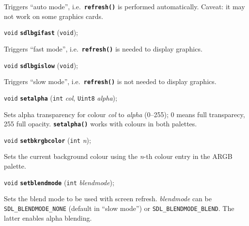 \documentclass[a4paper,12pt]{article}
\newcommand{\V}{\texttt{void}}      %
\newcommand{\I}{\texttt{int}}       %
\newcommand{\Ue}{\texttt{Uint8}}    %
\newcommand{\func}[1]{\textbf{\texttt{#1}}}  %
\newcommand{\A}[1]{\emph{#1}}       %
\newcommand{\T}[1]{\texttt{#1}}     %
\newenvironment{bgi}
{ %
  \begin{snugshade}
}
{ %
  \end{snugshade}
}
\begin{document}
Triggers ``auto mode'', i.e.\ \func{refresh()} is performed
automatically. Caveat: it may not work on some graphics cards.


\label{sec:sdlbgifast}

\begin{bgi}
\V{} \func{sdlbgifast} (\V{});
\end{bgi}

Triggers ``fast mode'', i.e.\ \func{refresh()} is needed to display
graphics.


\label{sec:sdlbgislow}

\begin{bgi}
\V{} \func{sdlbgislow} (\V{});
\end{bgi}

Triggers ``slow mode'', i.e.\ \func{refresh()} is not needed to
display graphics.


\label{sec:setalpha}

\begin{bgi}
\V{} \func{setalpha} (\I{} \A{col}, \Ue{} \A{alpha});
\end{bgi}

Sets alpha transparency for colour \A{col} to \A{alpha} (0--255); 0
means full transparecy, 255 full opacity. \func{setalpha()} works with
colours in both palettes.


\label{sec:setbkrgbcolor}

\begin{bgi}
\V{} \func{setbkrgbcolor} (\I{} \A{n});
\end{bgi}

Sets the current background colour using the \A{n}-th colour entry in
the ARGB palette.


\label{sec:setblendmode}

\begin{bgi}
\V{} \func{setblendmode} (\I{} \A{blendmode});
\end{bgi}

Sets the blend mode to be used with screen refresh. \A{blendmode} can
be \T{SDL\_BLENDMODE\-\_NONE} (default in ``slow mode'') or
\T{SDL\_BLENDMODE\_BLEND}. The latter enables alpha blending.
\end{document}
